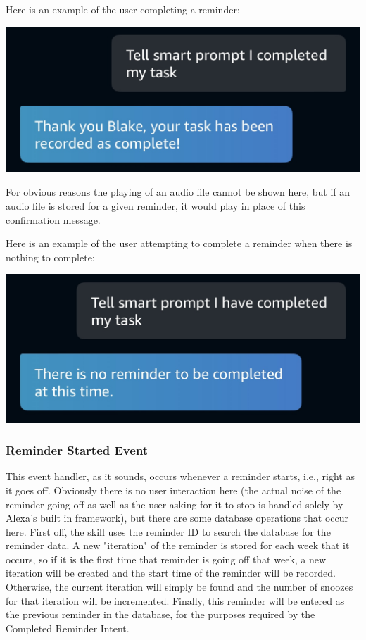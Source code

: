 \documentclass[11pt, oneside]{article}
\begin{document}
Here is an example of the user completing a reminder:
\begin{center}
  \includegraphics[width=\linewidth * 3/4]{images/completedReminder1.jpg}
\end{center}

For obvious reasons the playing of an audio file cannot be shown here, but if an audio file is stored for a given reminder, it would play in place of this confirmation message. 

Here is an example of the user attempting to complete a reminder when there is nothing to complete:
\begin{center}
  \includegraphics[width=\linewidth * 3/4]{images/completedReminder2.jpg}
\end{center}

\subsubsection{Reminder Started Event}

This event handler, as it sounds, occurs whenever a reminder starts, i.e., right as it goes off. 
Obviously there is no user interaction here (the actual noise of the reminder going off as well as the user asking for it to stop is handled solely by Alexa's built in framework), but there are some database operations that occur here. 
First off, the skill uses the reminder ID to search the database for the reminder data. 
A new "iteration" of the reminder is stored for each week that it occurs, so if it is the first time that reminder is going off that week, a new iteration will be created and the start time of the reminder will be recorded. 
Otherwise, the current iteration will simply be found and the number of snoozes for that iteration will be incremented. 
Finally, this reminder will be entered as the previous reminder in the database, for the purposes required by the Completed Reminder Intent. 
\end{document}
